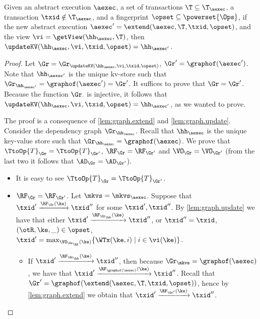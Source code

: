 \begin{proposition}
\label{prop:extend.update.sameop}
Given an abstract execution $\aexec$, a set of transactions $\T \subseteq \T_{\aexec}$,
a transaction $\txid \notin \T_{\aexec}$, and a fingerprint $\opset \subseteq \powerset{\Ops}$,
if the new abstract execution $\aexec' = \extend(\aexec, \T, \txid, \opset)$,
and the view $\vi = \getView(\hh_{\aexec}, \T)$,
then $\updateKV(\hh_{\aexec}, \vi, \txid, \opset) = \hh_{\aexec'}$.
\end{proposition}

\begin{proof}
Let $\Gr = \Gr_{\updateKV(\hh_{\aexec}, \vi, \txid, \opset)}$, $\Gr' = \graphof(\aexec')$. 
Note that $\hh_{\aexec'}$ is the unique kv-store such that $\Gr_{\hh_{\aexec'}} = \graphof(\aexec') = \Gr'$. 
It suffices to prove that $\Gr = \Gr'$. Because the function $\Gr_{\cdot}$ is injective, it follows that 
$\updateKV(\hh_{\aexec}, \vi, \txid, \opset) = \hh_{\aexec'}$, as we wanted to prove.  

The proof is a consequence of \cref{lem:graph.extend} and \cref{lem:graph.update}. 
Consider the dependency graph $\Gr_{\hh_{\aexec}}$.
Recall that $\hh_{\aexec}$ is the unique key-value store such that $\Gr_{\hh_{\aexec}} = \graphof(\aexec)$. 
We prove that $\TtoOp{T}_{\Gr} = \TtoOp{T}_{\Gr'}$, $\RF_{\Gr} = \RF_{\Gr'}$ and 
$\VO_{\Gr} = \VO_{\Gr'}$ (from the last two it follows that $\AD_{\Gr} = \AD_{\Gr'}$). 
\begin{itemize}
\item It is easy to see $\TtoOp{T}_{\Gr} = \TtoOp{T}_{\Gr'}$.

\item $\RF_{\Gr} = \RF_{\Gr'}$.
Let \( \mkvs  = \mkvs_\aexec \).
Suppose that $\txid' \xrightarrow{\RF_{\Gr}(\ke)} \txid''$ for some $\txid', \txid''$. 
By \cref{lem:graph.update} we have that either $\txid' \xrightarrow{\RF_{\Gr_\hh}(\ke)} \txid''$, 
or $\txid'' = \txid$, $(\otR, \ke, \_) \in \opset$, $\txid' = \max_{\VO_{\Gr_\hh}(\ke)}\{\WTx(\ke, i) \mid i \in \vi(\ke)\}$. 

\begin{itemize}
\item If $\txid' \xrightarrow{\RF_{\Gr_\hh}(\ke)} \txid''$, then because 
$\Gr_\mkvs = \graphof(\aexec)$, we have that $\txid' \xrightarrow{\RF_{\graphof(\aexec)}(\ke)} \txid''$. 
Recall that $\Gr' = \graphof(\extend(\aexec, \T, \txid, \opset))$, hence by \cref{lem:graph.extend} 
we obtain that $\txid' \xrightarrow{\RF_{\Gr'}(\ke)} \txid''$. 


\end{itemize}
\end{itemize}
\end{proof}
